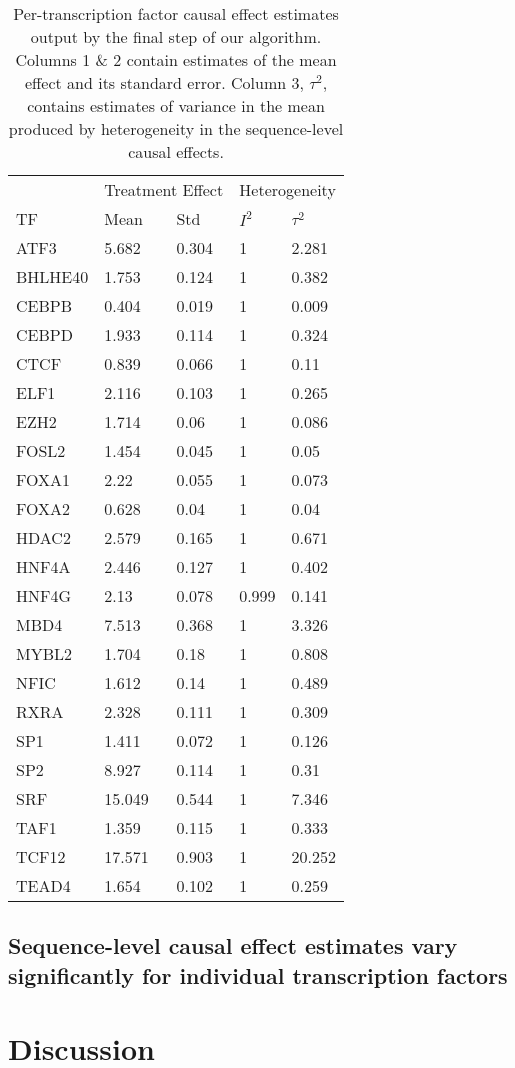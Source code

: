 \documentclass{article}
\begin{document}
\begin{table}[H]
    \caption{Per-transcription factor causal effect estimates output by the final step of our algorithm. Columns 1 \& 2 contain estimates of the mean effect and its standard error. Column 3, $ \tau^2 $, contains estimates of variance in the mean produced by heterogeneity in the sequence-level causal effects. \\}
    \label{tab:meta_results}
\centering
\begin{tabular}{l|l|l|l|l}
\hline
\multicolumn{1}{c|}{ } & \multicolumn{2}{c|}{Treatment Effect} & \multicolumn{2}{c}{Heterogeneity} \\
\cline{2-3} \cline{4-5}
TF & Mean & Std & $ I^2 $ & $ \tau^2 $\\
\hline
ATF3 & 5.682 & 0.304 & 1 & 2.281\\
\hline
BHLHE40 & 1.753 & 0.124 & 1 & 0.382\\
\hline
CEBPB & 0.404 & 0.019 & 1 & 0.009\\
\hline
CEBPD & 1.933 & 0.114 & 1 & 0.324\\
\hline
CTCF & 0.839 & 0.066 & 1 & 0.11\\
\hline
ELF1 & 2.116 & 0.103 & 1 & 0.265\\
\hline
EZH2 & 1.714 & 0.06 & 1 & 0.086\\
\hline
FOSL2 & 1.454 & 0.045 & 1 & 0.05\\
\hline
FOXA1 & 2.22 & 0.055 & 1 & 0.073\\
\hline
FOXA2 & 0.628 & 0.04 & 1 & 0.04\\
\hline
HDAC2 & 2.579 & 0.165 & 1 & 0.671\\
\hline
HNF4A & 2.446 & 0.127 & 1 & 0.402\\
\hline
HNF4G & 2.13 & 0.078 & 0.999 & 0.141\\
\hline
MBD4 & 7.513 & 0.368 & 1 & 3.326\\
\hline
MYBL2 & 1.704 & 0.18 & 1 & 0.808\\
\hline
NFIC & 1.612 & 0.14 & 1 & 0.489\\
\hline
RXRA & 2.328 & 0.111 & 1 & 0.309\\
\hline
SP1 & 1.411 & 0.072 & 1 & 0.126\\
\hline
SP2 & 8.927 & 0.114 & 1 & 0.31\\
\hline
SRF & 15.049 & 0.544 & 1 & 7.346\\
\hline
TAF1 & 1.359 & 0.115 & 1 & 0.333\\
\hline
TCF12 & 17.571 & 0.903 & 1 & 20.252\\
\hline
TEAD4 & 1.654 & 0.102 & 1 & 0.259\\
\hline
\end{tabular}
\end{table}

\subsection*{Sequence-level causal effect estimates vary significantly for individual transcription factors}

\section{Discussion}




\end{document}
